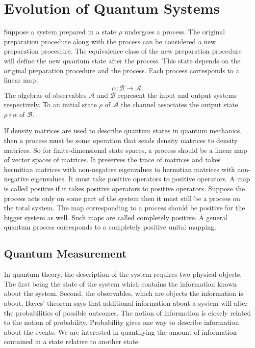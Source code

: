 \documentclass[11pt]{report}
\begin{document}
\section{Evolution of Quantum Systems}
Suppose a system prepared in a state $\rho$ undergoes a process. The original preparation procedure along with the process can be considered a new preparation procedure. The equivalence class of the new preparation procedure will define the new quantum state after the process. This state depends on the original preparation procedure and the process. Each process corresponds to a linear map,
$$\alpha:\mathcal{B}\to\mathcal{A}.$$
The algebras of observables $\mathcal{A}$ and $\mathcal{B}$ represent the input and output systems respectively. To an initial state $\rho$ of $\mathcal{A}$ the channel associates the output state $\rho\circ \alpha$ of $\mathcal{B}$. 

If density matrices are used to describe quantum states in quantum mechanics, then a process must be some operation that sends density matrices to density matrices. So for finite-dimensional state spaces, a process should be a linear map of vector spaces of matrices. It preserves the trace of matrices and takes hermitian matrices with non-negative eigenvalues to hermitian matrices with non-negative eigenvalues. It must take positive operators to positive operators. A map is called positive if it takes positive operators to positive operators. Suppose the process acts only on some part of the system then it must still be a process on the total system. The map corresponding to a process should be positive for the bigger system as well. Such maps are called completely positive. A general quantum process corresponds to a completely positive unital mapping.


\subsection{Quantum Measurement}\label{section:measurement}
In quantum theory, the description of the system requires two physical objects. The first being the state of the system which contains the information known about the system. Second, the observables, which are objects the information is about. Bayes' theorem says that additional information about a system will alter the probabilities of possible outcomes. The notion of information is closely related to the notion of probability. Probability gives one way to describe information about the events. We are interested in quantifying the amount of information contained in a state relative to another state. 
\end{document}
